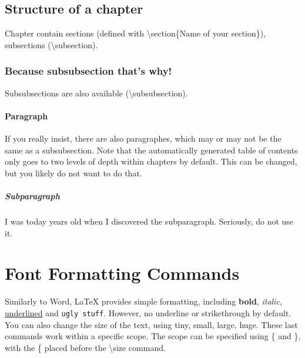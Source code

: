 \subsection{Structure of a chapter}
Chapter contain sections (defined with \textbackslash{}section\{Name of your section\}), subsections (\textbackslash{}subsection).

\subsubsection{Because subsubsection that's why!}
Subsubsections are also available (\textbackslash{}subsubsection).

\paragraph{Paragraph}
If you really insist, there are also paragraphes, which may or may not be the same as a subsubsection.
Note that the automatically generated table of contents only goes to two levels of depth within chapters by default.
This can be changed, but you likely do not want to do that.

\subparagraph{Subparagraph}
I was today years old when I discovered the subparagraph. Seriously, do not use it.

\section{Font Formatting Commands}
Similarly to Word, LaTeX provides simple formatting, including \textbf{bold}, \textit{italic}, \underline{underlined} and \texttt{ugly stuff}.
However, no underline or strikethrough by default.
You can also change the size of the text, using {\tiny tiny}, {\small small}, {\large large}, {\huge huge}.
These last commands work within a specific scope.
The scope can be specified using \{ and \}, with the \{ placed before the \textbackslash{}size command.

